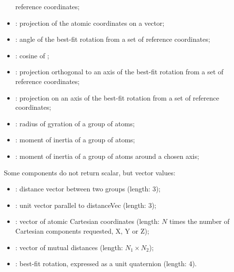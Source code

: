 \begin{itemize}
  reference coordinates;
\item {}: projection of the atomic coordinates on a
  vector;
\item {}: angle of the best-fit rotation from
  a set of reference coordinates;
\item {}: cosine of ;
\item {}: projection orthogonal to an axis of the best-fit rotation
  from a set of reference coordinates;
\item {}: projection on an axis of the best-fit rotation
  from a set of reference coordinates;
\item {}: radius of gyration of a group of atoms;
\item {}: moment of inertia of a group of atoms;
\item {}: moment of inertia of a group of atoms around a chosen axis;
\end{itemize}

Some components do not return scalar, but vector values:
\begin{itemize}
\item {}: distance vector between two groups (length: 3);
\item {}: unit vector parallel to distanceVec (length: 3);
\item {}: vector of atomic Cartesian coordinates (length: $N$ times the number of Cartesian components requested, X, Y or Z);
\item {}: vector of mutual distances (length: $N_{\mathrm{1}}\times{}N_{\mathrm{2}}$);
\item {}: best-fit rotation, expressed as a unit quaternion (length: 4).
\end{itemize}

